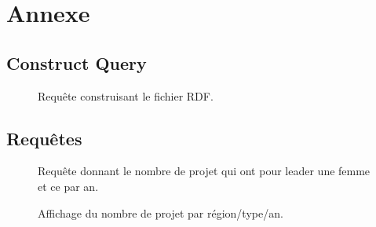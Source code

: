 \chapter{Annexe}
\section{Construct Query}

\begin{figure}[H]

\caption{Requête construisant le fichier RDF.}
\label{1} 
\end{figure}

\section{Requêtes}
\begin{figure}[H]

\caption{Requête donnant le nombre de projet qui ont pour leader une femme et ce par an.}
\label{req1} 
\end{figure}

\begin{figure}[H]

\caption{Affichage du nombre de projet par région/type/an.}
\label{req2} 
\end{figure}

